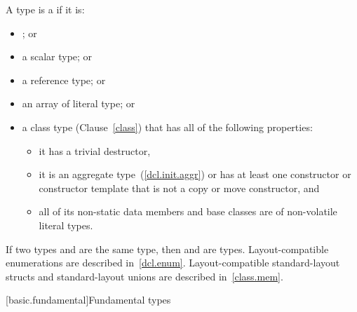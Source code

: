 \pnum
A type is a  if it is:

\begin{itemize}
\item {}; or
\item a scalar type; or
\item a reference type; or
\item an array of literal type; or
\item a class type (Clause~\ref{class}) that
has all of the following properties:
\begin{itemize}
\item it has a trivial destructor,
\item it is an aggregate type~(\ref{dcl.init.aggr}) or has
at least one  constructor or constructor template that is not a copy or move constructor, and
\item all of its non-static data members and base classes are
of non-volatile literal types.
\end{itemize}
\end{itemize}

\pnum
{}%
If two types  and  are the same type, then
 and  are  types.
\enternote Layout-compatible enumerations are described
in~\ref{dcl.enum}. Layout-compatible standard-layout
structs and standard-layout unions are
described in~\ref{class.mem}. \exitnote

[basic.fundamental]{Fundamental types}

